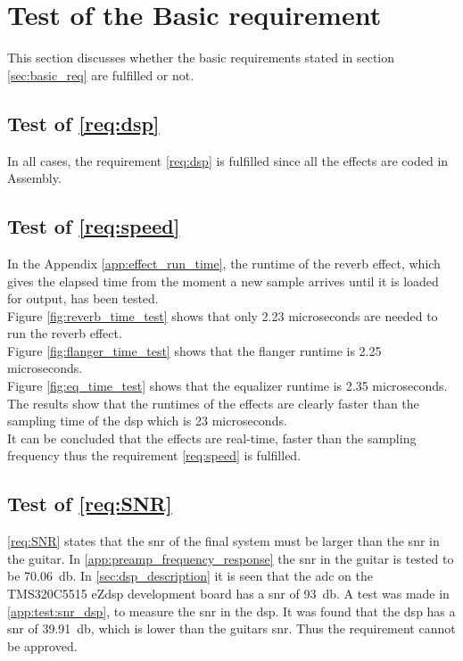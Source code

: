 \section{Test of the Basic requirement}
This section discusses whether the basic requirements stated in section \ref{sec:basic_req} are fulfilled or not. 

\subsection{Test of  \autoref{req:dsp}}
In all cases, the requirement \ref{req:dsp} is fulfilled since all the effects are coded in Assembly.


\subsection{Test of  \autoref{req:speed}}
In the Appendix \ref{app:effect_run_time}, the runtime of the reverb effect, which gives the elapsed time from the moment a new sample arrives until it is loaded for output, has been tested. \\
Figure \ref{fig:reverb_time_test} shows that only 2.23 microseconds are needed to run the \gls{reverb} effect. \\
Figure \ref{fig:flanger_time_test} shows that the flanger runtime is 2.25 microseconds. \\
Figure \ref{fig:eq_time_test} shows that the equalizer runtime is 2.35 microseconds. \\
The results show that the runtimes of the effects are clearly faster than the sampling time of the \gls{dsp} which is 23 microseconds. \\
It can be concluded that the effects are real-time, faster than the sampling frequency thus the requirement \ref{req:speed} is fulfilled. \\

\subsection{Test of \autoref{req:SNR}}
\autoref{req:SNR} states that the \gls{snr} of the final system must be larger than the \gls{snr} in the guitar. In \autoref{app:preamp_frequency_response} the \gls{snr} in the guitar is tested to be \SI{70.06}{\decibel}. In \autoref{sec:dsp_description} it is seen that the \gls{adc} on the TMS320C5515 eZdsp development board has a \gls{snr} of \SI{93}{\decibel}. A test was made in \autoref{app:test:snr_dsp}, to measure the \gls{snr} in the \gls{dsp}. It was found that the \gls{dsp} has a \gls{snr} of \SI{39.91}{\decibel}, which is lower than the guitars \gls{snr}. Thus the requirement cannot be approved. 

